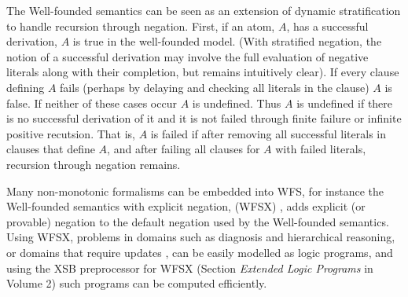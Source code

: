 The Well-founded semantics can be seen as an extension of dynamic
stratification to handle recursion through negation.  First, if an
atom, $A$, has a successful derivation, $A$ is true in the
well-founded model.  (With stratified negation, the notion of a
successful derivation may involve the full evaluation of negative
literals along with their completion, but remains intuitively clear).
If every clause defining $A$ fails (perhaps by delaying and checking
all literals in the clause) $A$ is false.  If neither of these cases
occur $A$ is undefined.  Thus $A$ is undefined if there is no
successful derivation of it and it is not failed through finite
failure or infinite positive recutsion.  That is, $A$ is failed if
after removing all successful literals in clauses that define $A$, and
after failing all clauses for $A$ with failed literals, recursion
through negation remains.

Many non-monotonic formalisms can be embedded into WFS, for instance
the Well-founded semantics with explicit negation, (WFSX)
\cite{ADP95}, adds explicit (or provable) negation to the default
negation used by the Well-founded semantics.  Using WFSX, problems in
domains such as diagnosis and hierarchical reasoning, or domains that
require updates \cite{Leit97}, can be easily modelled as logic
programs, and using the XSB preprocessor for WFSX (Section {\it Extended Logic Programs} in Volume 2) such programs can be computed
efficiently.

